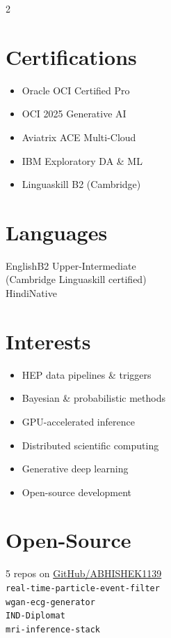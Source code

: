 \documentclass[10pt,a4paper]{extarticle}
\begin{document}
\begin{paracol}{2}
\begin{leftcolumn}
\section*{Certifications}
{\small
\begin{itemize}
  \item Oracle OCI Certified Pro
  \item OCI 2025 Generative AI
  \item Aviatrix ACE Multi-Cloud
  \item IBM Exploratory DA \& ML
  \item Linguaskill B2 (Cambridge)
\end{itemize}
}

\section*{Languages}
{\small
English\;\textbar\;B2 Upper-Intermediate\\
{\scriptsize (Cambridge Linguaskill certified)}\\
Hindi\;\textbar\;Native
}

\section*{Interests}
{\small
\begin{itemize}
  \item HEP data pipelines \& triggers
  \item Bayesian \& probabilistic methods
  \item GPU-accelerated inference
  \item Distributed scientific computing
  \item Generative deep learning
  \item Open-source development
\end{itemize}
}

\section*{Open-Source}
{\small
5 repos on \href{https://github.com/ABHISHEK1139}{\color{accent}GitHub/ABHISHEK1139}\\[2pt]
{\footnotesize
\texttt{real-time-particle-event-filter}\\
\texttt{wgan-ecg-generator}\\
\texttt{IND-Diplomat}\\
\texttt{mri-inference-stack}}
}

\end{leftcolumn}


\end{paracol}
\end{document}
